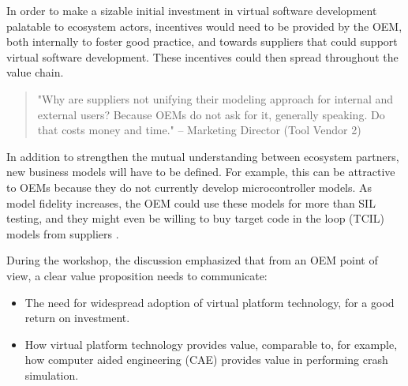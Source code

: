 In order to make a sizable initial investment in virtual software development palatable to ecosystem actors, incentives would need to be provided by the OEM, both internally to foster good practice, and towards suppliers that could support virtual software development. These incentives could then spread throughout the value chain.

\begin{quote}
"Why are suppliers not unifying their modeling approach for internal and external users? Because OEMs do not ask for it, generally speaking. Do that costs money and time."
-- Marketing Director (Tool Vendor 2)
\end{quote}


In addition to strengthen the mutual understanding between ecosystem partners, new business models will have to be defined.
For example, this can be attractive to OEMs because they do not currently develop microcontroller models.
As model fidelity increases, the OEM could use these models for more than SIL testing, and they might even be willing to buy target code in the loop (TCIL) models from suppliers \cite{Knauss2014d}.

During the workshop, the discussion emphasized that from an OEM point of view, a clear value proposition needs to communicate:
\begin{itemize}
\item The need for widespread adoption of virtual platform technology, for a good return on investment. 
\item How virtual platform technology provides value, comparable to, for example, how computer aided engineering (CAE) provides value in performing crash simulation.
\end{itemize}

